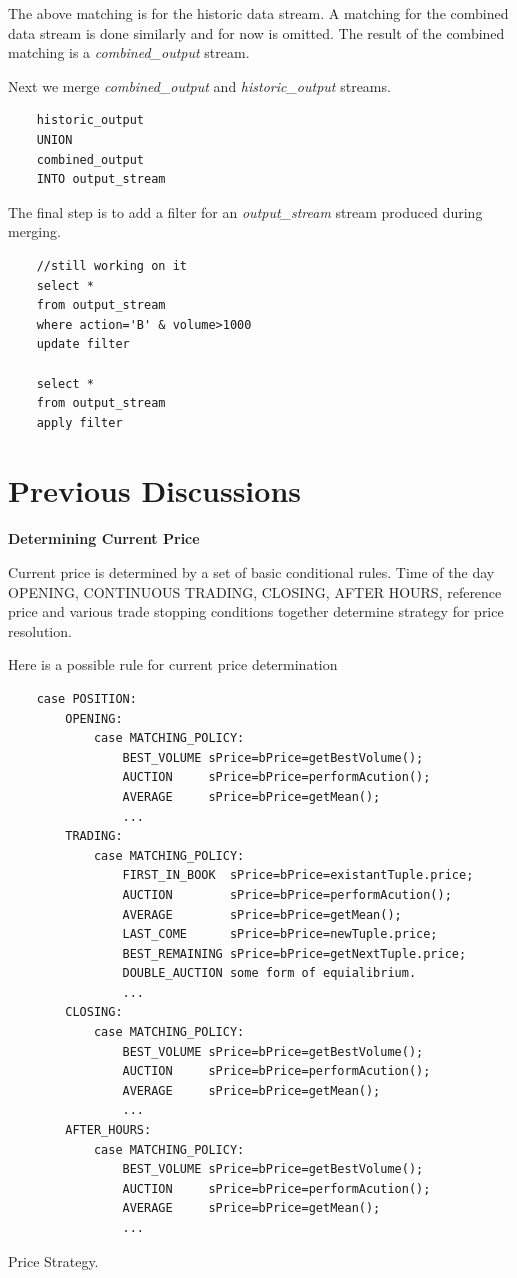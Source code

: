 \documentclass{article}
\begin{document}
The above matching is for the historic data stream. A matching for the combined data stream is done similarly and for now is omitted. The result of the combined matching is a \emph{combined\_output} stream. 

Next we merge \emph{combined\_output} and \emph{historic\_output} streams. 

\begin{verbatim}
    historic_output
    UNION
    combined_output
    INTO output_stream
\end{verbatim}

The final step is to add a filter for an \emph{output\_stream} stream produced during merging. 

\begin{verbatim}
    //still working on it
    select *
    from output_stream
    where action='B' & volume>1000
    update filter
    
    select *
    from output_stream
    apply filter
\end{verbatim}

\section{Previous Discussions}

{\bf Determining Current Price} 

Current price is determined by a set of basic conditional rules. Time of the day OPENING, CONTINUOUS TRADING, CLOSING, AFTER HOURS, reference price and various trade stopping conditions together determine strategy for price resolution.

Here is a possible rule for current price determination

\begin{program}
    \begin{verbatim}    
    case POSITION:
        OPENING:
            case MATCHING_POLICY:
                BEST_VOLUME sPrice=bPrice=getBestVolume();
                AUCTION     sPrice=bPrice=performAcution();
                AVERAGE     sPrice=bPrice=getMean();
                ...
        TRADING:
            case MATCHING_POLICY:
                FIRST_IN_BOOK  sPrice=bPrice=existantTuple.price;
                AUCTION        sPrice=bPrice=performAcution();
                AVERAGE        sPrice=bPrice=getMean();
                LAST_COME      sPrice=bPrice=newTuple.price;
                BEST_REMAINING sPrice=bPrice=getNextTuple.price;
                DOUBLE_AUCTION some form of equialibrium.
                ...       
        CLOSING:
            case MATCHING_POLICY:
                BEST_VOLUME sPrice=bPrice=getBestVolume();
                AUCTION     sPrice=bPrice=performAcution();
                AVERAGE     sPrice=bPrice=getMean();
                ...
        AFTER_HOURS:
            case MATCHING_POLICY:
                BEST_VOLUME sPrice=bPrice=getBestVolume();
                AUCTION     sPrice=bPrice=performAcution();
                AVERAGE     sPrice=bPrice=getMean();
                ...
    \end{verbatim}
\caption{Price Strategy. }
\end{program}
\end{document}
